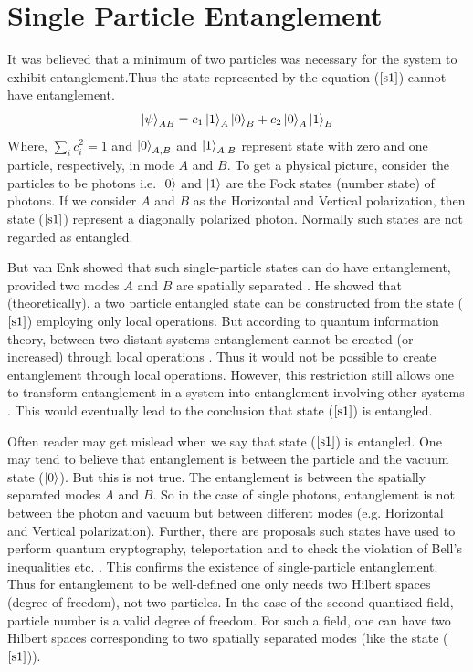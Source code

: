 \documentclass[12pt,a4paper]{report}
\begin{document}
\section{Single Particle Entanglement}
It was believed that a minimum of two particles was necessary for the system to exhibit entanglement.Thus the state represented by the equation ($\ref{s1}$) cannot have entanglement.
\begin{equation}
\label{s1}
\ket{\psi}_{AB} = c_{1}\ket{1}_{A}\ket{0}_{B} + c_{2}\ket{0}_{A}\ket{1}_{B}
\end{equation}
Where, $\sum_{i}c_{i}^{2} = 1$ and $\ket{0}_{A,B}$ and $\ket{1}_{A,B}$  represent state with zero and one particle, respectively, in mode $A$ and $B$. To get a physical picture, consider the particles to be photons i.e. $\ket{0}$ and $\ket{1}$ are the Fock states (number state) of photons. If we consider $A$ and $B$ as the Horizontal and Vertical polarization, then state ($\ref{s1}$) represent a diagonally polarized photon. Normally such states are not regarded as entangled.\par
But van Enk showed that such single-particle states can do have entanglement, provided two modes $A$ and $B$ are spatially separated \cite{vanenk2005}. He showed that (theoretically), a two particle entangled state can be constructed from the state ($\ref{s1}$) employing only local operations. But according to quantum information theory, between two distant systems entanglement cannot be created (or increased) through local operations \cite{bennet96}\cite{bennet96b}. Thus it would not be possible to create entanglement through local operations. However, this restriction still allows one to transform entanglement in a system into entanglement involving other systems \cite{popsecu97}. This would eventually lead to the conclusion that state ($\ref{s1}$) is entangled.\par

Often reader may get mislead when we say that state ($\ref{s1}$) is entangled. One may tend to believe that entanglement is between the particle and the vacuum state ($\ket{0}$). But this is not true. The entanglement is between the spatially separated modes $A$  and $B$. So in the case of single photons, entanglement is not between the photon and vacuum but between different modes (e.g. Horizontal and Vertical polarization). Further, there are proposals such states have used to perform quantum cryptography, teleportation and to check the violation of Bell’s inequalities etc. \cite{lee}\cite{lombardi}\cite{hessmo}. This confirms the existence of single-particle entanglement. Thus for entanglement to be well-defined one only needs two Hilbert spaces (degree of freedom), not two particles. In the case of the second quantized field, particle number is a valid degree of freedom. For such a field, one can have two Hilbert spaces corresponding to two spatially separated modes (like the state ($\ref{s1}$)).
\end{document}
